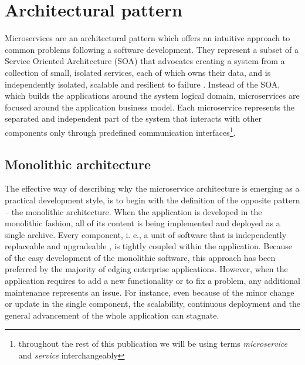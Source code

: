 \documentclass[oneside,
  digital, %
  table,   %
  nolof,     %
  nolot,     %
]{fithesis3}
\begin{document}
\section{Architectural pattern}

Microservices are an architectural pattern which offers an intuitive approach to common problems following a software development. They represent a subset of a Service Oriented Architecture (SOA) \cite{soa} that advocates creating a system from a collection of small, isolated services, each of which owns their data, and is independently isolated, scalable and resilient to failure \cite{reactive_ms_arch}. Instead of the SOA, which builds the applications around the system logical domain, microservices are focused around the application business model. Each microservice represents the separated and independent part of the system that interacts with other components only through predefined communication interfaces\footnote{throughout the rest of this publication we will be using terms \textit{microservice} and \textit{service} interchangeably}.

\subsection{Monolithic architecture}

The effective way of describing why the microservice architecture is emerging as a practical development style, is to begin with the definition of the opposite pattern -- the monolithic architecture. When the application is developed in the monolithic fashion, all of its content is being implemented and deployed as a single archive. Every component, i. e., a unit of software that is independently replaceable and upgradeable \cite{microservices}, is tightly coupled within the application. Because of the easy development of the monolithic software, this approach has been preferred by the majority of edging enterprise applications. However, when the application requires to add a new functionality or to fix a problem, any additional maintenance represents an issue. For instance, even because of the minor change or update in the single component, the scalability, continuous deployment and the general advancement of the whole application can stagnate. 
\end{document}
